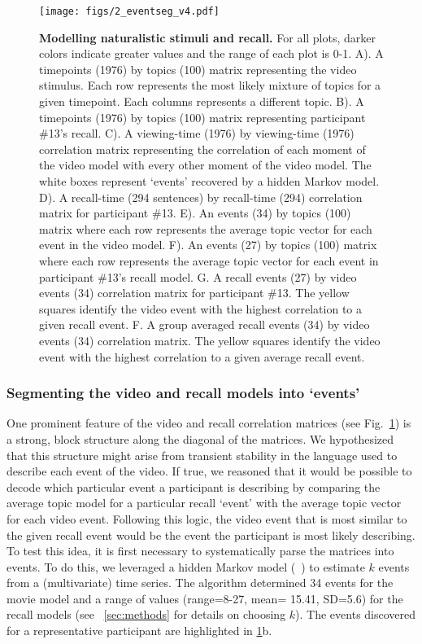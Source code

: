 \documentclass{article}
\begin{document}
{\begin{figure}[ht!]
\centering
\texttt{[image: figs/2\_eventseg\_v4.pdf]}
\caption{\small \textbf{Modelling naturalistic stimuli and recall.} For all plots, darker colors indicate greater values and the range of each plot is 0-1.  A). A timepoints (1976) by topics (100) matrix representing the video stimulus.  Each row represents the most likely mixture of topics for a given timepoint. Each columns represents a different topic. B). A timepoints (1976) by topics (100) matrix representing participant \#13's recall. C). A viewing-time (1976) by viewing-time (1976) correlation matrix representing the correlation of each moment of the video model with every other moment of the video model. The white boxes represent `events' recovered by a hidden Markov model. D). A recall-time (294 sentences) by recall-time (294) correlation matrix for participant \#13. E). An events (34) by topics (100) matrix where each row represents the average topic vector for each event in the video model.  F). An events (27) by topics (100) matrix where each row represents the average topic vector for each event in participant \#13's recall model. G. A recall events (27) by video events (34) correlation matrix for participant \#13. The yellow squares identify the video event with the highest correlation to a given recall event. F. A group averaged recall events (34) by video events (34) correlation matrix.  The yellow squares identify the video event with the highest correlation to a given average recall event.}
\label{fig:model}
\end{figure}

\subsubsection{Segmenting the video and recall models into `events'}
One prominent feature of the video and recall correlation matrices (see Fig.~\ref{fig:model}) is a strong, block structure along the diagonal of the matrices.  We hypothesized that this structure might arise from transient stability in the language used to describe each event of the video. If true, we reasoned that it would be possible to decode which particular event a participant is describing by comparing the average topic model for a particular recall `event' with the average topic vector for each video event. Following this logic, the video event that is most similar to the given recall event would be the event the participant is most likely describing.  To test this idea, it is first necessary to systematically parse the matrices into events.  To do this, we leveraged a hidden Markov model (~\citep{BaldEtal17}) to estimate $k$ events from a (multivariate) time series. The algorithm determined 34 events for the movie model and a range of values (range=8-27, mean= 15.41, SD=5.6) for the recall models (see ~\ref{sec:methods} for details on choosing $k$).  The events discovered for a representative participant are highlighted in \ref{fig:model}b.

}
\end{document}
